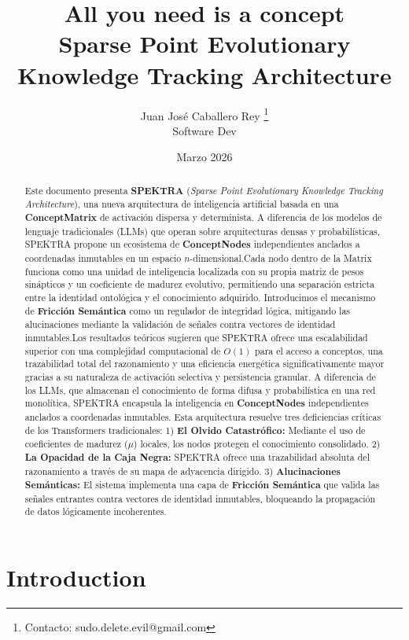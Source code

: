 \documentclass[12pt]{article}
\title{\textbf{All you need is a concept} \\[0.5em] \large Sparse Point Evolutionary Knowledge Tracking Architecture}
\author{Juan José Caballero Rey \thanks{ Contacto: sudo.delete.evil@gmail.com} \\ \small{Software Dev}}
\date{Marzo 2026}
\begin{document}
\maketitle

\begin{abstract}Este documento presenta \textbf{SPEKTRA} (\textit{Sparse Point Evolutionary Knowledge Tracking Architecture}), una nueva arquitectura de inteligencia artificial basada en una \textbf{ConceptMatrix} de activación dispersa y determinista. A diferencia de los modelos de lenguaje tradicionales (LLMs) que operan sobre arquitecturas densas y probabilísticas, SPEKTRA propone un ecosistema de \textbf{ConceptNodes} independientes anclados a coordenadas inmutables en un espacio $n$-dimensional.Cada nodo dentro de la Matrix funciona como una unidad de inteligencia localizada con su propia matriz de pesos sinápticos y un coeficiente de madurez evolutivo, permitiendo una separación estricta entre la identidad ontológica y el conocimiento adquirido. Introducimos el mecanismo de \textbf{Fricción Semántica} como un regulador de integridad lógica, mitigando las alucinaciones mediante la validación de señales contra vectores de identidad inmutables.Los resultados teóricos sugieren que SPEKTRA ofrece una escalabilidad superior con una complejidad computacional de $O(1)$ para el acceso a conceptos, una trazabilidad total del razonamiento y una eficiencia energética significativamente mayor gracias a su naturaleza de activación selectiva y persistencia granular. 
A diferencia de los LLMs, que almacenan el conocimiento de forma difusa y probabilística en una red monolítica, SPEKTRA encapsula la inteligencia en \textbf{ConceptNodes} independientes anclados a coordenadas inmutables. Esta arquitectura resuelve tres deficiencias críticas de los Transformers tradicionales: 
1) \textbf{El Olvido Catastrófico:} Mediante el uso de coeficientes de madurez ($\mu$) locales, los nodos protegen el conocimiento consolidado. 
2) \textbf{La Opacidad de la Caja Negra:} SPEKTRA ofrece una trazabilidad absoluta del razonamiento a través de su mapa de adyacencia dirigido. 
3) \textbf{Alucinaciones Semánticas:} El sistema implementa una capa de \textbf{Fricción Semántica} que valida las señales entrantes contra vectores de identidad inmutables, bloqueando la propagación de datos lógicamente incoherentes.
\end{abstract}


\section{Introduction}
\end{document}
